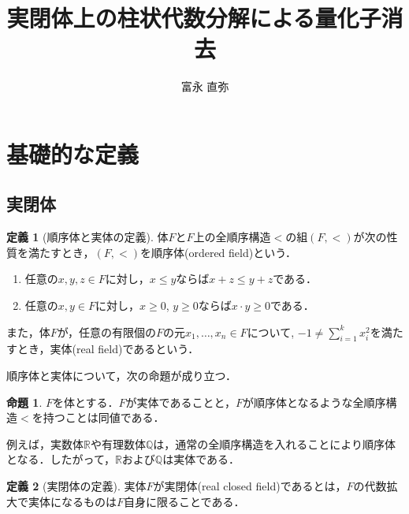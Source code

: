 \documentclass[uplatex, dvipdfmx]{jsarticle}
\newcommand{\R}{\mathbb{R}}
\newcommand{\Q}{\mathbb{Q}}
\theoremstyle{definition}
\newtheorem{definition}{定義}[section]
\newtheorem{proposition}{命題}[section]
\begin{document}
\title{実閉体上の柱状代数分解による量化子消去}
\author{富永 直弥}
\maketitle

\section{基礎的な定義}

\subsection{実閉体}


\begin{definition}[順序体と実体の定義]
     体$F$と$F$上の全順序構造$<$の組$(F,<)$が次の性質を満たすとき，$(F,<)$を順序体(ordered field)という．
     \begin{enumerate}
          \item 任意の$x,y,z\in F$に対し，$x \leq y$ならば$x + z \leq y + z$である．
          \item 任意の$x,y \in F$に対し，$x \geq 0$, $y \geq 0$ならば$x \cdot y \geq 0$である．
     \end{enumerate}

     また，体$F$が，任意の有限個の$F$の元$x_1, \dots, x_n \in F$について, $-1 \neq \sum_{i=1}^k x_i^2$を満たすとき，実体(real field)であるという．
\end{definition}

順序体と実体について，次の命題が成り立つ．

\begin{proposition}
     $F$を体とする．$F$が実体であることと，$F$が順序体となるような全順序構造$<$を持つことは同値である．
\end{proposition}

例えば，実数体$\R$や有理数体$\Q$は，通常の全順序構造を入れることにより順序体となる．したがって，$\R$および$\Q$は実体である．

\begin{definition}[実閉体の定義]
     実体$F$が実閉体(real closed field)であるとは，$F$の代数拡大で実体になるものは$F$自身に限ることである．
\end{definition}
\end{document}
